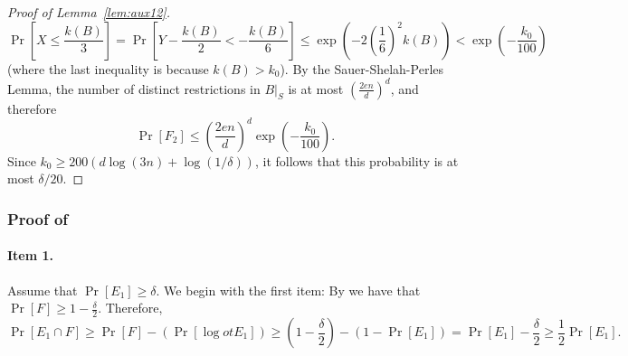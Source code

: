 \documentclass{article}
\newcommand{\comment}[3]{}  %
\newcommand{\shay}[1]{\comment{purple}{Shay}{#1}}
\newcommand{\akshay}[1]{\comment{blue}{Akshay}{#1}}
\newcommand{\yoav}[1]{\comment{green}{Yoav}{#1}}
\begin{document}
\begin{proof}[Proof of Lemma~\ref{lem:aux12}]
\[
\Pr\left[X\leq \frac{k(B)}{3}\right] =\Pr\left[Y- \frac{k(B)}{2} < -\frac{k(B)}{6}\right]
						\leq \exp\left(-2\left(\frac{1}{6}\right)^2k(B)\right) 
						< \exp\left(-\frac{k_0}{100}\right)
\]
(where the last inequality is because $k(B) > k_0$).
By the Sauer-Shelah-Perles Lemma,
the number of distinct restrictions in $B|_S$ is at most $\left(\frac{2en}{d}\right)^d$, and therefore 
\[\Pr[F_2]\leq \left(\frac{2en}{d}\right)^d\exp\left(-\frac{k_0}{100}\right).\]
Since $k_0\geq 200\left(d\log(3n) + \log(1/\delta) \right)$, it follows
that this probability is at most $\delta/20$.
\end{proof}


\subsubsection{Proof of }

\paragraph{Item 1.}
Assume that $\Pr[E_1]\geq \delta$.
We begin with the first item:
By  we have that $\Pr[F]\geq 1-\frac{\delta}{2}$.
Therefore,
\[\Pr[E_1\cap F] \geq \Pr[F] - (\Pr[\log ot E_1]) \geq (1-\frac{\delta}{2}) - (1-\Pr[E_1]) = \Pr[E_1] - \frac{\delta}{2}\geq\frac{1}{2}\Pr[E_1].\]
\end{document}
